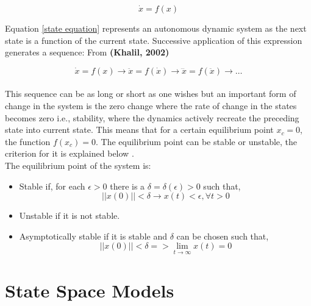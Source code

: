\documentclass{UoNMCHA}
\numberwithin{equation}{section}
\begin{document}
	\begin{equation} \label{state equation}
	\dot{x} = f(x)
	\end{equation} 
	
	Equation \ref{state equation} represents an autonomous dynamic system as the next state is a function of the current state. Successive application of this expression generates a sequence: From \textbf{(Khalil, 2002)}
	
	\begin{equation} \label{arrows equation}
	\dot{x}=f\left(x\right)\rightarrow\ddot{x}=f\left(\dot{x}\right)\rightarrow\dddot{x}=f\left(\ddot{x}\right)\rightarrow\ldots
	\end{equation} \\
	
	This sequence can be as long or short as one wishes but an important form of change in the system is the zero change where the rate of change in the states becomes zero i.e., stability, where the dynamics actively recreate the preceding state into current state. This means that for a certain equilibrium point $x_{c}= 0$, the function $f(x_{c})=0$. The equilibrium point can be stable or unstable, the criterion for it is explained below \cite{hasankhalil_2002_solutions}. \\
	
	The equilibrium point of the system is: \\
	
	\begin{itemize}
		\item 	Stable if, for each $\epsilon>0$ there is a $\delta=\delta (\epsilon)>0$ such that,
		\begin{equation*}
		\left|\left|x\left(0\right)\right|\right|<\delta\rightarrow x(t)<\epsilon,\forall t>0  
		\end{equation*}
		\item Unstable if it is not stable.
		\item Asymptotically stable if it is stable and $\delta$ can be chosen such that,
		\begin{equation*}
		\left|\left|x\left(0\right)\right|\right|<\delta=>\lim_{t\to \infty}{x(t)=0}
		\end{equation*}
		
	\end{itemize}
	
	\section{State Space Models}\label{State Space Models}
	
\end{document}
